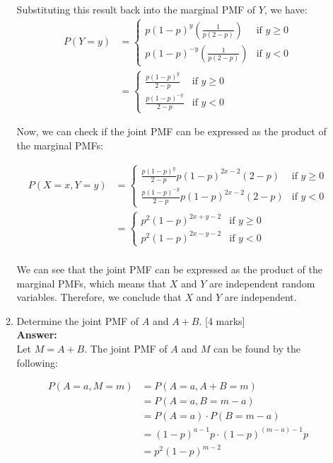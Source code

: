 \documentclass[12pt]{article}
\begin{document}
\begin{enumerate}
\begin{enumerate}
Substituting this result back into the marginal PMF of $Y$, we have:
\begin{align*}
P(Y=y) &= \begin{cases}
p(1-p)^{y} \left(\frac{1}{p(2-p)}\right) & \text{if } y \geq 0 \\
p(1-p)^{-y} \left(\frac{1}{p(2-p)}\right) & \text{if } y < 0
\end{cases} \\
&= \begin{cases}
\frac{p(1-p)^{y}}{2-p} & \text{if } y \geq 0 \\
\frac{p(1-p)^{-y}}{2-p} & \text{if } y < 0
\end{cases}
\end{align*}

Now, we can check if the joint PMF can be expressed as the product of the marginal PMFs:

\begin{align*}
P(X=x, Y=y) &= \begin{cases}
\frac{p(1-p)^{y}}{2-p} p(1-p)^{2x-2} \left( 2-p \right) & \text{if } y \geq 0 \\
\frac{p(1-p)^{-y}}{2-p} p(1-p)^{2x-2} \left( 2-p \right) & \text{if } y < 0
\end{cases} \\
&= \begin{cases}
p^2(1-p)^{2x+y-2} & \text{if } y \geq 0 \\
p^2(1-p)^{2x-y-2} & \text{if } y < 0
\end{cases} \\
\end{align*}

We can see that the joint PMF can be expressed as the product of the marginal PMFs, which means that $X$ and $Y$ are independent random variables. Therefore, we conclude that $X$ and $Y$ are independent.
%

\item Determine the joint PMF of $A$ and $A+B$. 
			\hfill [4 marks]
%
\\
\textbf{Answer:}
\\
Let $M = A + B$. The joint PMF of $A$ and $M$ can be found by the following:

\begin{align*}
P(A=a, M=m) &= P(A=a, A+B=m) \\
&= P(A=a, B=m-a) \\
&= P(A=a) \cdot P(B=m-a) \\
&= (1-p)^{a-1}p \cdot (1-p)^{(m-a)-1}p \\
&= p^2(1-p)^{m-2} \\
\end{align*}
%


\end{enumerate}
\end{enumerate}
\end{document}
